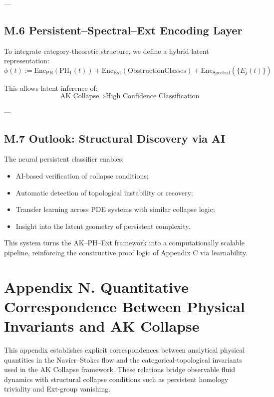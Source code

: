 \documentclass[11pt]{article}
\theoremstyle{definition}
\begin{document}
---

\subsection*{M.6 Persistent–Spectral–Ext Encoding Layer}

To integrate category-theoretic structure, we define a hybrid latent representation:
\[
\phi(t) := \mathrm{Enc}_{\mathrm{PH}}(\mathrm{PH}_1(t)) + \mathrm{Enc}_{\mathrm{Ext}}(\mathrm{Obstruction Classes}) + \mathrm{Enc}_{\text{Spectral}}(\{E_j(t)\})
\]

This allows latent inference of:
\[
\text{AK Collapse} \Rightarrow \text{High Confidence Classification}
\]

---

\subsection*{M.7 Outlook: Structural Discovery via AI}

The neural persistent classifier enables:
\begin{itemize}
  \item AI-based verification of collapse conditions;
  \item Automatic detection of topological instability or recovery;
  \item Transfer learning across PDE systems with similar collapse logic;
  \item Insight into the latent geometry of persistent complexity.
\end{itemize}

This system turns the AK–PH–Ext framework into a computationally scalable pipeline, reinforcing the constructive proof logic of Appendix C via learnability.

\section*{Appendix N. Quantitative Correspondence Between Physical Invariants and AK Collapse}

This appendix establishes explicit correspondences between analytical physical quantities in the Navier--Stokes flow and the categorical-topological invariants used in the AK Collapse framework. These relations bridge observable fluid dynamics with structural collapse conditions such as persistent homology triviality and Ext-group vanishing.
\end{document}
